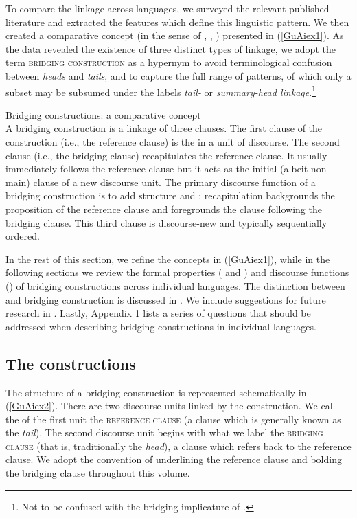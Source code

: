 \documentclass[output=paper]{LSP/langsci}
\begin{document}
To compare the linkage across languages, we surveyed the relevant published literature and extracted the features which define this linguistic pattern. We then created a comparative concept (in the sense of \citealt{haspelmath10}, \citealt{haspelmath16}, \citealt{croft.2016}) presented in (\ref{GuAiex1}). As the data revealed the existence of three distinct types of linkage, we adopt the term \textsc{bridging construction} as a hypernym to avoid terminological confusion between \textit{heads} and \textit{tails}, and to capture the full range of patterns, of which only a subset may be subsumed under the labels \textit{tail-} or \textit{summary-head linkage}.\footnote{Not to be confused with the bridging implicature of \citealt{clark75}.} 

\begin{exe}
\ex	\label{GuAiex1}
\glt Bridging constructions: a comparative concept\\
\glt A bridging construction is a linkage of three clauses. The first clause of the construction (i.e., the reference clause) is the  in a unit of discourse. The second clause (i.e., the bridging clause) recapitulates the reference clause. It usually immediately follows the reference clause but it acts as the initial (albeit non-main) clause of a new discourse unit. The primary discourse function of a bridging construction is to add structure and : recapitulation backgrounds the proposition of the reference clause and foregrounds the clause following the bridging clause. This third clause is discourse-new and typically sequentially ordered.
\end{exe}
 
In the rest of this section, we refine the concepts in (\ref{GuAiex1}), while in the following sections we review the formal properties ( and ) and discourse functions () of bridging constructions across individual languages. The distinction between  and bridging construction is discussed in . We include suggestions for future research in . Lastly, Appendix 1 lists a series of questions that should be addressed when describing bridging constructions in individual languages. 

\subsection{The constructions}
\label{GuAi1.1construction}
The structure of a bridging construction is represented schematically in (\ref{GuAiex2}). There are two discourse units linked by the construction. We call the  of the first unit the \textsc{reference clause} (a clause which is generally known as the \textit{tail}). The second discourse unit begins with what we label the \textsc{bridging clause} (that is, traditionally the \textit{head}), a clause which refers back to the reference clause. We adopt the convention of underlining the reference clause and bolding the bridging clause throughout this volume. 
\end{document}
